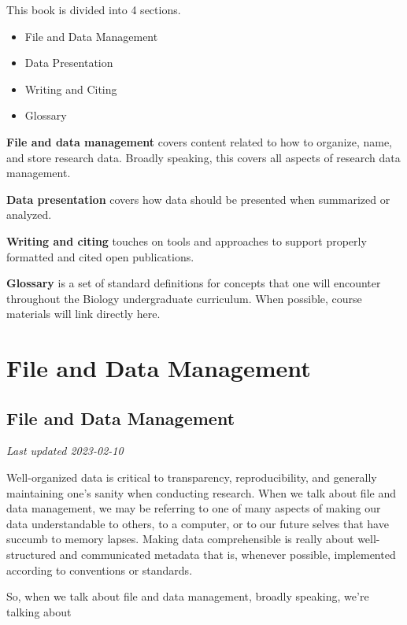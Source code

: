 \documentclass[
]{book}
\providecommand{\tightlist}{%
  \setlength{\itemsep}{0pt}\setlength{\parskip}{0pt}}
\begin{document}
This book is divided into 4 sections.

\begin{itemize}
\tightlist
\item
  File and Data Management
\item
  Data Presentation
\item
  Writing and Citing
\item
  Glossary
\end{itemize}

\textbf{File and data management} covers content related to how to organize, name, and store research data. Broadly speaking, this covers all aspects of research data management.

\textbf{Data presentation} covers how data should be presented when summarized or analyzed.

\textbf{Writing and citing} touches on tools and approaches to support properly formatted and cited open publications.

\textbf{Glossary} is a set of standard definitions for concepts that one will encounter throughout the Biology undergraduate curriculum. When possible, course materials will link directly here.

\hypertarget{part-file-and-data-management}{%
\part*{File and Data Management}\label{part-file-and-data-management}}

\hypertarget{file-and-data-management}{%
\chapter{File and Data Management}\label{file-and-data-management}}

\emph{Last updated 2023-02-10}

Well-organized data is critical to transparency, reproducibility, and generally maintaining one's sanity when conducting research. When we talk about file and data management, we may be referring to one of many aspects of making our data understandable to others, to a computer, or to our future selves that have succumb to memory lapses. Making data comprehensible is really about well-structured and communicated metadata that is, whenever possible, implemented according to conventions or standards.

So, when we talk about file and data management, broadly speaking, we're talking about
\end{document}
